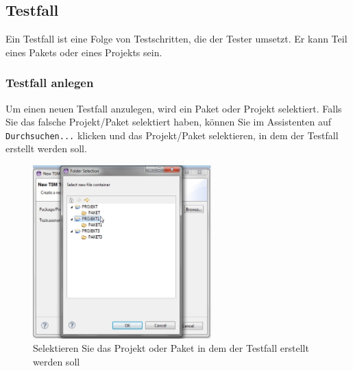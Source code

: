 \documentclass[11pt,a4paper,titlepage]{article}
\begin{document}
\subsection{Testfall}
Ein Testfall ist eine Folge von Testschritten, die der Tester umsetzt. Er kann Teil eines Pakets oder eines Projekts sein.

\subsubsection{Testfall anlegen}
Um einen neuen Testfall anzulegen, wird ein Paket oder Projekt selektiert.
Falls Sie das falsche Projekt/Paket selektiert haben, können Sie im Assistenten auf \texttt{Durchsuchen...} klicken und das Projekt/Paket selektieren, in dem der Testfall erstellt werden soll.

\begin{figure}[H]
\centering
\includegraphics[width= 260px]{BilderHandbuch/Testfall/Browse.png}
\caption{Selektieren Sie das Projekt oder Paket in dem der Testfall erstellt werden soll}
\label{fig:Browse}
\end{figure}
\end{document}
